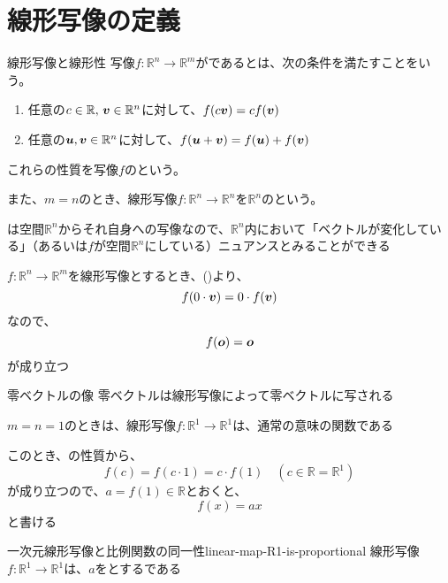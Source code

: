 \documentclass[../../../topic_linear-algebra]{subfiles}
\begin{document}
\sectionline
\section{線形写像の定義}

\begin{definition*}{線形写像と線形性}
  写像$f\colon \mathbb{R}^n \to \mathbb{R}^m$がであるとは、次の条件を満たすことをいう。
  \begin{enumerate}[label=\romanlabel]
    \item 任意の$c \in \mathbb{R} , \, \vb*{v} \in \mathbb{R}^n$に対して、$f(c\vb*{v}) = cf(\vb*{v})$
    \item 任意の$\vb*{u}, \vb*{v} \in \mathbb{R}^n$に対して、$f(\vb*{u} + \vb*{v}) = f(\vb*{u}) + f(\vb*{v})$
  \end{enumerate}
  これらの性質を写像$f$のという。

  また、$m=n$のとき、線形写像$f\colon \mathbb{R}^n \to \mathbb{R}^n$を$\mathbb{R}^n$のという。
\end{definition*}

は空間$\mathbb{R}^n$からそれ自身への写像なので、$\mathbb{R}^n$内において「ベクトルが変化している」（あるいは$f$が空間$\mathbb{R}^n$にしている）ニュアンスとみることができる

\sectionline

$f\colon \mathbb{R}^n \to \mathbb{R}^m$を線形写像とするとき、()より、
\begin{equation*}
  f(0 \cdot \vb*{v}) = 0 \cdot f(\vb*{v})
\end{equation*}
なので、
\begin{equation*}
  f(\vb*{o}) = \vb*{o}
\end{equation*}
が成り立つ

\begin{theorem*}{零ベクトルの像}
  零ベクトルは線形写像によって零ベクトルに写される
\end{theorem*}

\sectionline

$m=n=1$のときは、線形写像$f\colon \mathbb{R}^1 \to \mathbb{R}^1$は、通常の意味の関数である

このとき、の性質から、
\begin{equation*}
  f(c) = f(c \cdot 1) = c \cdot f(1) \quad (c \in \mathbb{R} = \mathbb{R}^1)
\end{equation*}
が成り立つので、$a = f(1) \in \mathbb{R}$とおくと、
\begin{equation*}
  f(x) = ax
\end{equation*}
と書ける

\begin{theorem}{一次元線形写像と比例関数の同一性}{linear-map-R1-is-proportional}
  線形写像$f\colon \mathbb{R}^1 \to \mathbb{R}^1$は、$a$をとするである
\end{theorem}
\end{document}
